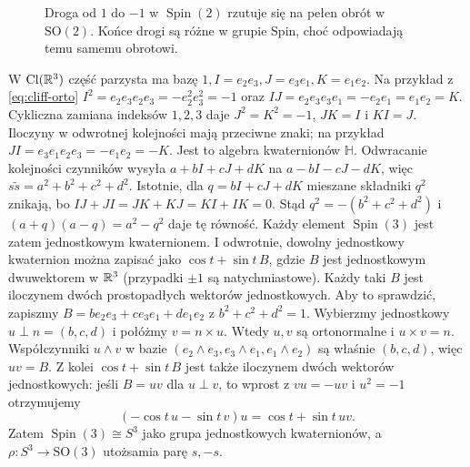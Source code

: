 \begin{figure}[!htbp]
\centering
{}
\caption{Droga od $1$ do $-1$ w $\operatorname{Spin}(2)$
rzutuje się na pełen obrót w $\mathrm{SO}(2)$.
Końce drogi są różne w grupie Spin, choć odpowiadają
temu samemu obrotowi.}
\label{fig:spin-dwukrotne}
\end{figure}

\begin{przyklad}
\label{prz:spin3}
W $\operatorname{Cl}(\mathbb{R}^3)$ część parzysta ma bazę
$1,I=e_2e_3,J=e_3e_1,K=e_1e_2$.
Na przykład z \eqref{eq:cliff-orto}
$I^2=e_2e_3e_2e_3=-e_2^2e_3^2=-1$ oraz
$IJ=e_2e_3e_3e_1=-e_2e_1=e_1e_2=K$.
Cykliczna zamiana indeksów $1,2,3$ daje
$J^2=K^2=-1$, $JK=I$ i $KI=J$.
Iloczyny w odwrotnej kolejności mają przeciwne znaki;
na przykład $JI=e_3e_1e_2e_3=-e_1e_2=-K$.
Jest to algebra kwaternionów $\mathbb H$.
Odwracanie kolejności czynników wysyła
$a+bI+cJ+dK$ na $a-bI-cJ-dK$,
więc $s\widetilde s=a^2+b^2+c^2+d^2$.
Istotnie, dla $q=bI+cJ+dK$ mieszane składniki $q^2$
znikają, bo $IJ+JI=JK+KJ=KI+IK=0$.
Stąd $q^2=-(b^2+c^2+d^2)$ i
$(a+q)(a-q)=a^2-q^2$ daje tę równość.
Każdy element $\operatorname{Spin}(3)$
jest zatem jednostkowym kwaternionem.
I odwrotnie, dowolny jednostkowy kwaternion
można zapisać jako $\cos t+\sin t\,B$,
gdzie $B$ jest jednostkowym dwuwektorem
w $\mathbb{R}^3$ (przypadki $\pm1$ są natychmiastowe).
Każdy taki $B$ jest iloczynem dwóch
prostopadłych wektorów jednostkowych. Aby to sprawdzić,
zapiszmy $B=b e_2e_3+c e_3e_1+d e_1e_2$ z $b^2+c^2+d^2=1$.
Wybierzmy jednostkowy $u\perp n=(b,c,d)$ i połóżmy
$v=n\times u$. Wtedy $u,v$ są ortonormalne i $u\times v=n$.
Współczynniki $u\wedge v$ w bazie
$(e_2\wedge e_3,e_3\wedge e_1,e_1\wedge e_2)$ są właśnie $(b,c,d)$,
więc $uv=B$. Z kolei
$\cos t+\sin t\,B$ jest także iloczynem dwóch
wektorów jednostkowych: jeśli $B=uv$ dla
$u\perp v$, to wprost z $vu=-uv$ i $u^2=-1$
otrzymujemy
\[
 (-\cos t\,u-\sin t\,v)u
     =\cos t+\sin t\,uv.
\]
Zatem $\operatorname{Spin}(3)\cong S^3$
jako grupa jednostkowych kwaternionów,
a $\rho:S^3\to\mathrm{SO}(3)$ utożsamia
parę $s,-s$.
\end{przyklad}

